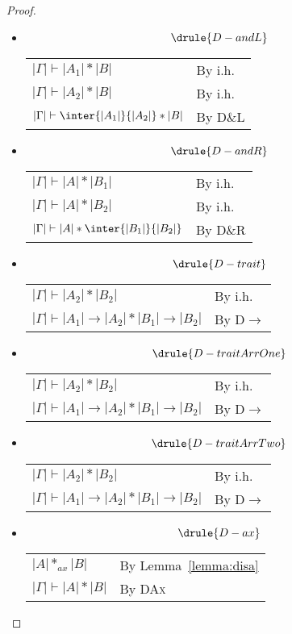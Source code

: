 \begin{proof}
\begin{itemize}
  \item \[  \drule{D-andL}  \]
    \begin{longtable}[l]{ll}
      $|\Gamma| \vdash |A_1| * |B|$ & By i.h. \\
      $|\Gamma| \vdash |A_2| * |B|$ & By i.h. \\
      $|\Gamma| \vdash \inter{|A_1|}{|A_2|} * |B|$ & By \textsc{D\&L}
    \end{longtable}
  \item \[ \drule{D-andR}   \]
    \begin{longtable}[l]{ll}
      $|\Gamma| \vdash |A| * |B_1|$ & By i.h. \\
      $|\Gamma| \vdash |A| * |B_2|$ & By i.h. \\
      $|\Gamma| \vdash |A| * \inter{|B_1|}{|B_2|}$ & By \textsc{D\&R}
    \end{longtable}
  \item \[ \drule{D-trait}  \]
    \begin{longtable}[l]{ll}
      $|\Gamma| \vdash |A_2| * |B_2|$ & By i.h. \\
      $|\Gamma| \vdash |A_1| \rightarrow |A_2| * |B_1| \rightarrow |B_2|$ & By \textsc{D$\rightarrow$}
    \end{longtable}
  \item \[ \drule{D-traitArrOne}   \]
    \begin{longtable}[l]{ll}
      $|\Gamma| \vdash |A_2| * |B_2|$ & By i.h. \\
      $|\Gamma| \vdash |A_1| \rightarrow |A_2| * |B_1| \rightarrow |B_2|$ & By \textsc{D$\rightarrow$}
    \end{longtable}
  \item \[ \drule{D-traitArrTwo}  \]
    \begin{longtable}[l]{ll}
      $|\Gamma| \vdash |A_2| * |B_2|$ & By i.h. \\
      $|\Gamma| \vdash |A_1| \rightarrow |A_2| * |B_1| \rightarrow |B_2|$ & By \textsc{D$\rightarrow$}
    \end{longtable}
  \item \[  \drule{D-ax}  \]
    \begin{longtable}[l]{ll}
      $|A| *_{ax} |B|$ & By Lemma~\ref{lemma:disa} \\
      $|\Gamma| \vdash |A| * |B|$ & By \textsc{DAx}
    \end{longtable}
  \end{itemize}
\end{proof}



